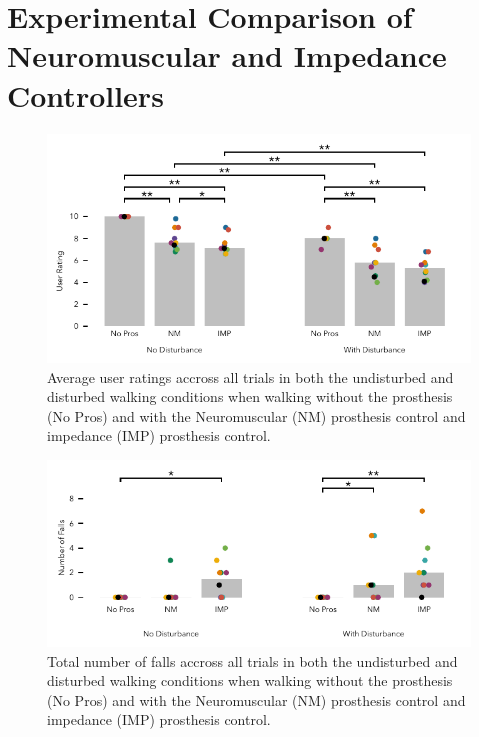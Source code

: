 \chapter{Experimental Comparison of Neuromuscular and Impedance Controllers}\label{sec:nm_vs_imp}
\graphicspath{{chapters/nm_imp_comparison/figures/}}

\begin{figure}[h]
    \centering 
    \includegraphics[width=\textwidth]{treadmill_vib_user_scores}
    \caption{Average user ratings accross all trials in both the 
    undisturbed and disturbed walking conditions when walking without the
    prosthesis (No Pros) and with the Neuromuscular (NM) prosthesis control and
    impedance (IMP) prosthesis control.}\label{fig:treadmill_user_ratings}
\end{figure}

\begin{figure}[h]
    \centering 
    \includegraphics[width=\textwidth]{treadmill_vib_num_falls}
    \caption{Total number of falls accross all trials in both the 
    undisturbed and disturbed walking conditions when walking without the
    prosthesis (No Pros) and with the Neuromuscular (NM) prosthesis control and
    impedance (IMP) prosthesis control.}\label{fig:treadmill_exp_falls}
\end{figure}

